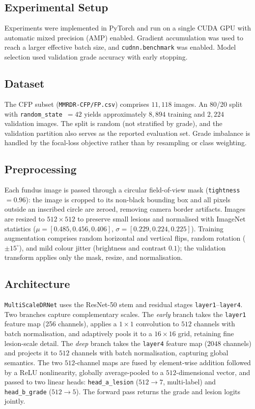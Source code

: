 \documentclass[journal,twoside,web]{ieeecolor}
\begin{document}
\subsection{Experimental Setup}
Experiments were implemented in PyTorch and run on a single CUDA GPU with
automatic mixed precision (AMP) enabled. Gradient accumulation was used to reach
a larger effective batch size, and \texttt{cudnn.benchmark} was enabled. Model
selection used validation grade accuracy with early stopping.

\subsection{Dataset}
The CFP subset (\texttt{MMRDR-CFP/FP.csv}) comprises $11{,}118$ images. An 80/20
split with \texttt{random\_state}~$=42$ yields approximately $8{,}894$ training
and $2{,}224$ validation images. The split is random (not stratified by grade),
and the validation partition also serves as the reported evaluation set. Grade
imbalance is handled by the focal-loss objective rather than by resampling or
class weighting.

\subsection{Preprocessing}
Each fundus image is passed through a circular field-of-view mask
(\texttt{tightness}~$=0.96$): the image is cropped to its non-black bounding box
and all pixels outside an inscribed circle are zeroed, removing camera border
artifacts. Images are resized to $512\times512$ to preserve small lesions and
normalised with ImageNet statistics ($\mu=[0.485,0.456,0.406]$,
$\sigma=[0.229,0.224,0.225]$). Training augmentation comprises random horizontal
and vertical flips, random rotation ($\pm15^{\circ}$), and mild colour jitter
(brightness and contrast $0.1$); the validation transform applies only the mask,
resize, and normalisation.

\subsection{Architecture}
\texttt{MultiScaleDRNet} uses the ResNet-50 stem and residual stages
\texttt{layer1}--\texttt{layer4}. Two branches capture complementary scales.
The \emph{early} branch takes the \texttt{layer1} feature map (256 channels),
applies a $1\times1$ convolution to $512$ channels with batch normalisation, and
adaptively pools it to a $16\times16$ grid, retaining fine lesion-scale detail.
The \emph{deep} branch takes the \texttt{layer4} feature map ($2048$ channels)
and projects it to $512$ channels with batch normalisation, capturing global
semantics. The two $512$-channel maps are fused by element-wise addition
followed by a ReLU nonlinearity, globally average-pooled to a $512$-dimensional
vector, and passed to two linear heads: \texttt{head\_a\_lesion}
($512\!\rightarrow\!7$, multi-label) and \texttt{head\_b\_grade}
($512\!\rightarrow\!5$). The forward pass returns the grade and lesion logits
jointly.
\end{document}
